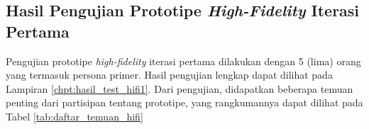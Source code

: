 \subsection{Hasil Pengujian Prototipe \textit{High-Fidelity} Iterasi Pertama}
\label{subsec:test_1_hasil}

Pengujian prototipe \textit{high-fidelity} iterasi pertama dilakukan dengan 5 (lima) orang yang termasuk persona primer. Hasil pengujian lengkap dapat dilihat pada Lampiran \ref{chpt:hasil_test_hifi1}. Dari pengujian, didapatkan beberapa temuan penting dari partisipan tentang prototipe, yang rangkumannya dapat dilihat pada Tabel \ref{tab:daftar_temuan_hifi}


